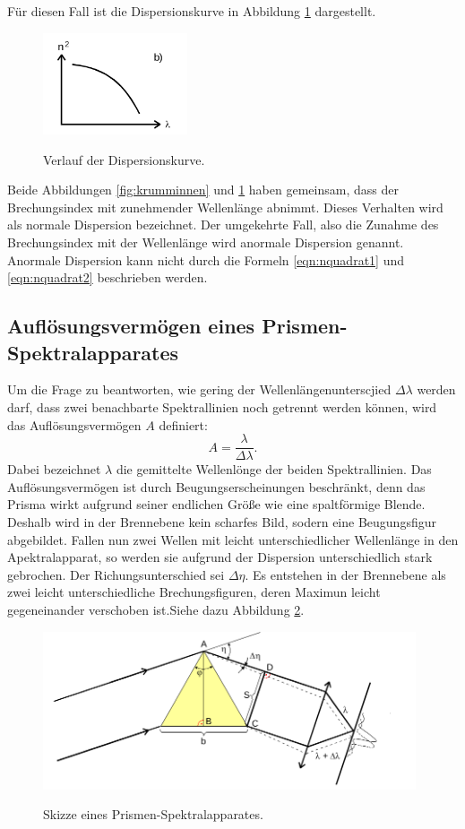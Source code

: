 Für diesen Fall ist die Dispersionskurve in Abbildung \ref{fig:krummaußen}
dargestellt.

\begin{figure}[H]
  \centering
  \includegraphics[height=3cm]{n2.png}
  \caption{Verlauf der Dispersionskurve.}
  \label{fig:krummaußen}
  \cite{skript}
\end{figure}


Beide Abbildungen \ref{fig:krumminnen} und \ref{fig:krummaußen} haben gemeinsam, dass
der Brechungsindex mit zunehmender Wellenlänge abnimmt. Dieses Verhalten wird als
normale Dispersion bezeichnet. Der umgekehrte Fall, also die Zunahme des
Brechungsindex mit der Wellenlänge wird anormale Dispersion genannt.
Anormale Dispersion kann nicht durch die Formeln \ref{eqn:nquadrat1} und
\ref{eqn:nquadrat2} beschrieben werden.

\subsection{Auflösungsvermögen eines Prismen-Spektralapparates}
Um die Frage zu beantworten, wie gering der Wellenlängenunterscjied $\Delta \lambda$
werden darf, dass zwei benachbarte Spektrallinien noch getrennt werden können,
wird das Auflösungsvermögen $A$ definiert:
\begin{equation}
  A=\frac{\lambda}{\Delta \lambda}.
  \label{eqn:auflösung}
\end{equation}
Dabei bezeichnet $\lambda$ die gemittelte Wellenlönge der beiden
Spektrallinien.
Das Auflösungsvermögen ist durch Beugungserscheinungen beschränkt, denn
das Prisma wirkt aufgrund seiner endlichen Größe wie eine
spaltförmige Blende. Deshalb wird in der Brennebene kein scharfes Bild, sodern
eine Beugungsfigur abgebildet.
Fallen nun zwei Wellen mit leicht unterschiedlicher Wellenlänge in den
Apektralapparat, so werden sie aufgrund der Dispersion unterschiedlich
stark gebrochen. Der Richungsunterschied sei $\Delta \eta$.
Es entstehen in der Brennebene als zwei leicht unterschiedliche Brechungsfiguren,
deren Maximun leicht gegeneinander verschoben ist.Siehe dazu Abbildung
\ref{fig:auflösung}.

\begin{figure}[H]
  \centering
  \includegraphics[width=11cm]{beug.png}
  \caption{Skizze eines Prismen-Spektralapparates.}
  \label{fig:auflösung}
  \cite{skript}
\end{figure}

